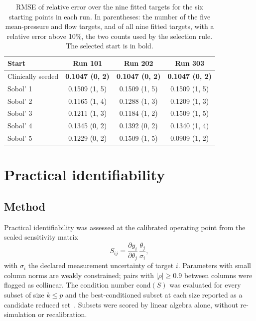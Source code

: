 \documentclass{article}
\begin{document}
\begin{table}[H]
\centering\small
\caption{RMSE of relative error over the nine fitted targets for the six starting points in each run. In parentheses: the number of the five mean-pressure and flow targets, and of all nine fitted targets, with a relative error above 10\%, the two counts used by the selection rule. The selected start is in bold.}
\label{tab:S-multistart}
\begin{tabular}{lccc}
\toprule
\textbf{Start} & \textbf{Run 101} & \textbf{Run 202} & \textbf{Run 303} \\
\midrule
Clinically seeded & \textbf{0.1047 (0, 2)} & \textbf{0.1047 (0, 2)} & \textbf{0.1047 (0, 2)} \\
Sobol' 1 & 0.1509 (1, 5) & 0.1509 (1, 5) & 0.1509 (1, 5) \\
Sobol' 2 & 0.1165 (1, 4) & 0.1288 (1, 3) & 0.1209 (1, 3) \\
Sobol' 3 & 0.1211 (1, 3) & 0.1184 (1, 2) & 0.1509 (1, 5) \\
Sobol' 4 & 0.1345 (0, 2) & 0.1392 (0, 2) & 0.1340 (1, 4) \\
Sobol' 5 & 0.1229 (0, 2) & 0.1509 (1, 5) & 0.0909 (1, 2) \\
\bottomrule
\end{tabular}
\end{table}

\section{Practical identifiability}
\label{sec:S-identifiability}

\subsection{Method}
Practical identifiability was assessed at the calibrated operating point from the scaled sensitivity matrix~\cite{Pope2009,Olufsen2013}
\begin{equation}
S_{ij} = \frac{\partial y_i}{\partial \theta_j}\,\frac{\theta_j}{\sigma_i},
\end{equation}
with $\sigma_i$ the declared measurement uncertainty of target $i$. Parameters with small column norms are weakly constrained; pairs with $|\rho| \ge 0.9$ between columns were flagged as collinear. The condition number $\mathrm{cond}(S)$ was evaluated for every subset of size $k \le p$ and the best-conditioned subset at each size reported as a candidate reduced set~\cite{vanOsta2020}. Subsets were scored by linear algebra alone, without re-simulation or recalibration.
\end{document}
